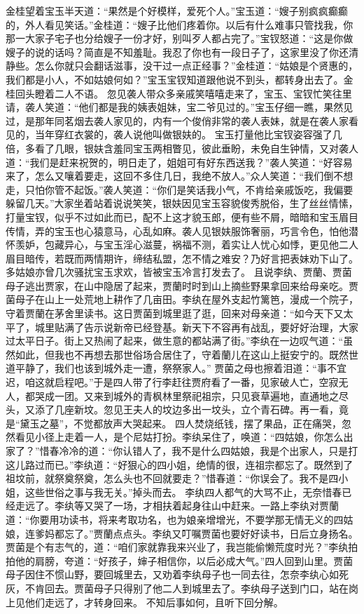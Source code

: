 \documentclass[12pt,oneside]{book}
\begin{document}
金桂望着宝玉半天道：“果然是个好模样，爱死个人。”宝玉道：“嫂子别疯疯癫癫的，外人看见笑话。”金桂道：“嫂子比他们疼着你。以后有什么难事只管找我，你那一大家子宅子也分给嫂子一份才好，别叫歹人都占完了。”宝钗怒道：“这是你做嫂子的说的话吗？简直是不知羞耻。我忍了你也有一段日子了，这家里没了你还清静些。怎么你就只会翻话滋事，没干过一点正经事？”金桂道：“姑娘是个贤惠的，我们都是小人，不如姑娘何如？”宝玉宝钗知道跟他说不到头，都转身出去了。金桂回头瞪着二人不语。
忽见袭人带众多亲戚笑嘻嘻走来了，宝玉、宝钗忙笑往里请，袭人笑道：“他们都是我的姨表姐妹，宝二爷见过的。”宝玉仔细一瞧，果然见过，是那年同茗烟去袭人家见的，内有一个俊俏非常的袭人表妹，就是在袭人家看见的，当年穿红衣裳的，袭人说他叫做银妋的。
宝玉打量他比宝钗姿容强了几倍，多看了几眼，银妋含羞同宝玉两相瞥见，彼此垂盼，未免自生钟情，又对袭人道：“我们是赶来祝贺的，明日走了，姐姐可有好东西送我？”袭人笑道：“好容易来了，怎么又嚷着要走，这回不多住几日，我绝不放人。”众人笑道：“我们倒不想走，只怕你管不起饭。”袭人笑道：“你们是笑话我小气，不肯给亲戚饭吃，我偏要躲留几天。”大家坐着站着说说笑笑，银妋因见宝玉容貌俊秀脱俗，生了丝丝情愫，打量宝钗，似乎不过如此而已，配不上这才貌玉郎，便有些不屑，暗暗和宝玉眉目传情，弄的宝玉也心猿意马，心乱如麻。袭人见银妋服饰奢丽，巧言令色，怕他潜怀羡妒，包藏异心，与宝玉淫心滋蔓，祸福不测，着实让人忧心如悸，更见他二人眉目暗传，若既而两情期许，缔结私盟，怎不情之难安？乃好言把表妹劝下山了。多姑娘亦曾几次骚扰宝玉求欢，皆被宝玉冷言打发去了。
且说李纨、贾蘭、贾菌母子逃出贾家，在山中隐居了起来，贾蘭时时到山上摘些野果拿回来给母亲吃。贾菌母子在山上一处荒地上耕作了几亩田。李纨在屋外支起竹篱笆，漫成一个院子，守着贾蘭在茅舍里读书。这日贾菌到城里逛了逛，回来对母亲道：“如今天下又太平了，城里贴满了告示说新帝已经登基。新天下不容再有战乱，要好好治理，大家过太平日子。街上又热闹了起来，做生意的都站满了街。”李纨在一边叹气道：“虽然如此，但我也不再想去那世俗场合居住了，守着蘭儿在这山上挺安宁的。既然世道平静了，我们也该到城外走一遭，祭祭家人。”
贾菌之母也擦着泪道：“事不宜迟，咱这就启程吧。”于是四人带了行李赶往贾府看了一番，见家破人亡，空寂无人，都哭成一团。又来到城外的青枫林里祭祀祖宗，只见衰草遍地，直通地之尽头，又添了几座新坟。忽见王夫人的坟边多出一坟头，立个青石碑。再一看，竟是“黛玉之墓”，不觉都放声大哭起来。
四人焚烧纸钱，摆了果品，正在痛哭，忽然看见小径上走着一人，是个尼姑打扮。李纨呆住了，唤道：“四姑娘，你怎么出家了？”惜春冷冷的道：“你认错人了，我不是什么四姑娘，我是个出家人，只是打这儿路过而已。”李纨道：“好狠心的四小姐，绝情的很，连祖宗都忘了。既然到了祖坟前，就祭奠祭奠，怎么头也不回就要走？”惜春道：“你误会了。我不是四小姐，这些世俗之事与我无关。”掉头而去。
李纨四人都气的大骂不止，无奈惜春已经走远了。李纨等又哭了一场，才相扶着起身往山中赶来。一路上李纨对贾蘭道：“你要用功读书，将来考取功名，也为娘亲增增光，不要学那无情无义的四姑娘，连爹妈都忘了。”贾蘭点点头。李纨又叮嘱贾菌也要好好读书，日后立身扬名。贾菌是个有志气的，道：“咱们家就靠我来兴业了，我岂能偷懒荒度时光？”李纨拍拍他的肩膀，夸道：“好孩子，婶子相信你，以后必成大气。”四人回到山里。贾菌母子因住不惯山野，要回城里去，又劝着李纨母子也一同去往，怎奈李纨心如死灰，不肯回去。贾菌母子只得别了他二人到城里去了。李纨母子送到门口，站在岗上见他们走远了，才转身回来。
不知后事如何，且听下回分解。
 
\end{document}
